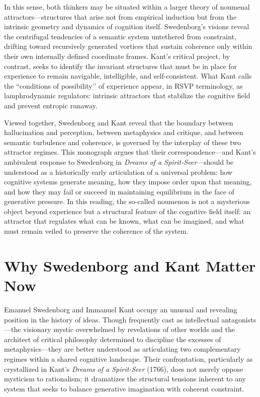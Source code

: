 \documentclass[12pt]{article}
\begin{document}
In this sense, both thinkers may be situated within a larger theory of 
noumenal attractors—structures that arise not from empirical induction but 
from the intrinsic geometry and dynamics of cognition itself. Swedenborg’s 
visions reveal the centrifugal tendencies of a semantic system untethered from 
constraint, drifting toward recursively generated vortices that sustain 
coherence only within their own internally defined coordinate frames. Kant’s 
critical project, by contrast, seeks to identify the invariant structures that 
must be in place for experience to remain navigable, intelligible, and 
self-consistent. What Kant calls the ``conditions of possibility’’ of 
experience appear, in RSVP terminology, as lamphrodynamic regulators: 
intrinsic attractors that stabilize the cognitive field and prevent entropic 
runaway.

Viewed together, Swedenborg and Kant reveal that the boundary between 
hallucination and perception, between metaphysics and critique, and between 
semantic turbulence and coherence, is governed by the interplay of these two 
attractor regimes. This monograph argues that their correspondence—and Kant’s 
ambivalent response to Swedenborg in \emph{Dreams of a Spirit-Seer}—should be 
understood as a historically early articulation of a universal problem: how 
cognitive systems generate meaning, how they impose order upon that meaning, 
and how they may fail or succeed in maintaining equilibrium in the face of 
generative pressure. In this reading, the so-called noumenon is not a 
mysterious object beyond experience but a structural feature of the cognitive 
field itself: an attractor that regulates what can be known, what can be 
imagined, and what must remain veiled to preserve the coherence of the system.


\section{Why Swedenborg and Kant Matter Now}

Emanuel Swedenborg and Immanuel Kant occupy an unusual and revealing position in 
the history of ideas. Though frequently cast as intellectual antagonists—the 
visionary mystic overwhelmed by revelations of other worlds and the architect of 
critical philosophy determined to discipline the excesses of metaphysics—they are 
better understood as articulating two complementary regimes within a shared 
cognitive landscape. Their confrontation, particularly as crystallized in Kant’s 
\emph{Dreams of a Spirit-Seer} (1766), does not merely oppose mysticism to 
rationalism; it dramatizes the structural tensions inherent to any system that 
seeks to balance generative imagination with coherent constraint.
\end{document}

